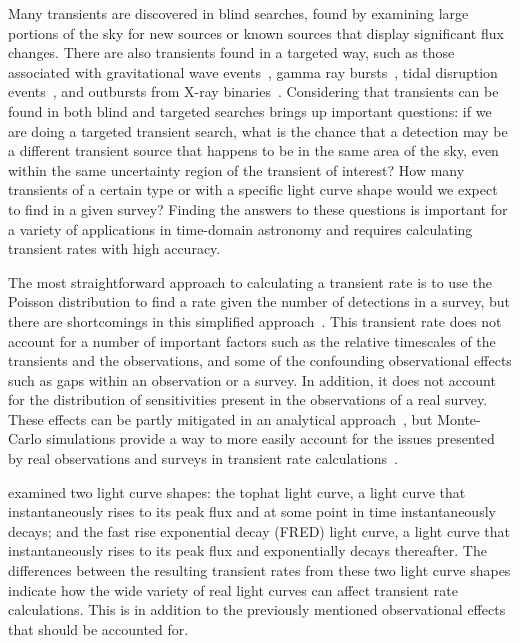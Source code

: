 \documentclass[12pt]{article}
\begin{document}
Many transients are discovered in blind searches, found by examining large portions of the sky for new sources or known sources that display significant flux changes. There are also transients found in a targeted way, such as those associated with gravitational wave events~\citep{2017PhRvL.119p1101A,2017Natur.551...71T,2018ApJ...868L..11M}, gamma ray bursts~\citep{1997Natur.389..261F,2018MNRAS.473.1512A}, tidal disruption events~\citep{2011Sci...333..199L,2016Sci...351...62V}, and outbursts from X-ray binaries~\citep{2004MNRAS.355.1105F,2017MNRAS.469.3141T}. Considering that transients can be found in both blind and targeted searches brings up important questions: if we are doing a targeted transient search, what is the chance that a detection may be a different transient source that happens to be in the same area of the sky, even within the same uncertainty region of the transient of interest? How many transients of a certain type or with a specific light curve shape would we expect to find in a given survey? Finding the answers to these questions is important for a variety of applications in time-domain astronomy and requires calculating transient rates with high accuracy. 

The most straightforward approach to calculating a transient rate is to use the Poisson distribution to find a rate given the number of detections in a survey, but there are shortcomings in this simplified approach~\citep{2016MNRAS.459.3161C}. This transient rate does not account for a number of important factors such as the relative timescales of the transients and the observations, and some of the confounding observational effects such as gaps within an observation or a survey. In addition, it does not account for the distribution of sensitivities present in the observations of a real survey. These effects can be partly mitigated in an analytical approach~\citep{2016MNRAS.459.3161C}, but Monte-Carlo simulations provide a way to more easily account for the issues presented by real observations and surveys in transient rate calculations~\citep{2017MNRAS.465.4106C}. 

\citet{2017MNRAS.465.4106C} examined two light curve shapes: the tophat light curve, a light curve that instantaneously rises to its peak flux and at some point in time instantaneously decays; and the fast rise exponential decay (FRED) light curve, a light curve that instantaneously rises to its peak flux and exponentially decays thereafter. The differences between the resulting transient rates from these two light curve shapes indicate how the wide variety of real light curves can affect transient rate calculations. This is in addition to the previously mentioned observational effects that should be accounted for. 
\end{document}
